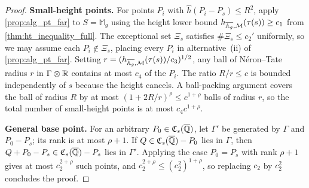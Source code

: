 \begin{proof}
  \textbf{Small-height points.}
  For points \(P_i\) with \(\hat{h}(P_i - P_s) \le R^2\), apply
  \cref{prop:alg_pt_far} to \(S = \mathbb{M}_g\) using the height lower
  bound \(h_{\overline{\mathbb{A}_g},\mathcal{M}}(\tau(s)) \ge c_1\) from
  \cref{thm:ht_inequality_full}. The exceptional set \(\Xi_s\) satisfies
  \(\#\Xi_s \le c_2'\) uniformly, so we may assume each \(P_i \notin \Xi_s\),
  placing every \(P_i\) in alternative~(ii) of \cref{prop:alg_pt_far}.
  Setting \(r = (h_{\overline{\mathbb{A}_g},\mathcal{M}}(\tau(s))/c_3)^{1/2}\),
  any ball of Néron--Tate radius \(r\) in \(\Gamma \otimes \mathbb{R}\) contains at
  most \(c_4\) of the \(P_i\). The ratio \(R/r \le c\) is bounded independently
  of \(s\) because the height cancels. A ball-packing argument covers the ball
  of radius \(R\) by at most \((1 + 2R/r)^\rho \le c^{1+\rho}\) balls of radius
  \(r\), so the total number of small-height points is at most \(c_4 c^{1+\rho}\).

  \textbf{General base point.}
  For an arbitrary \(P_0 \in \mathfrak{C}_s(\overline{\mathbb{Q}})\), let \(\Gamma'\) be
  generated by \(\Gamma\) and \(P_0 - P_s\); its rank is at most \(\rho + 1\).
  If \(Q \in \mathfrak{C}_s(\overline{\mathbb{Q}}) - P_0\) lies in \(\Gamma\), then
  \(Q + P_0 - P_s \in \mathfrak{C}_s(\overline{\mathbb{Q}}) - P_s\) lies in \(\Gamma'\).
  Applying the case \(P_0 = P_s\) with rank \(\rho + 1\) gives at most
  \(c_2^{2+\rho}\) such points, and \(c_2^{2+\rho} \le (c_2^2)^{1+\rho}\),
  so replacing \(c_2\) by \(c_2^2\) concludes the proof.
\end{proof}
